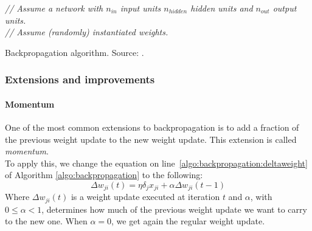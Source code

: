 \begin{algorithm}[htb]
\DontPrintSemicolon
{}
\emph{// Assume a network with $n_{in}$ input units $n_{hidden}$ hidden units and $n_{out}$ output units.}\\
\emph{// Assume (randomly) instantiated weights.}\\
\caption[Backpropagation]{Backpropagation algorithm. Source: \cite[Chapter~4]{ML}.}
\label{algo:backpropagation}
\end{algorithm}
\subsubsection{Extensions and improvements} %
\label{ssub:extensions_and_improvements}
\paragraph{Momentum} %
\label{par:momentum}
One of the most common extensions to backpropagation is to add a fraction of the previous weight update to the new weight update. This extension is called \textit{momentum}.\\
To apply this, we change the equation on line~\ref{algo:backpropagation:deltaweight} of Algorithm \ref{algo:backpropagation} to the following:
\begin{equation}
    \Delta w_{ji}(t) = \eta \delta_j x_{ji} + \alpha \Delta w_{ji}(t-1)
\end{equation}
Where $\Delta w_{ji}(t)$ is a weight update executed at iteration $t$ and $\alpha$, with $0 \le \alpha < 1$, determines how much of the previous weight update we want to carry to the new one. When $\alpha = 0$, we get again the regular weight update.

